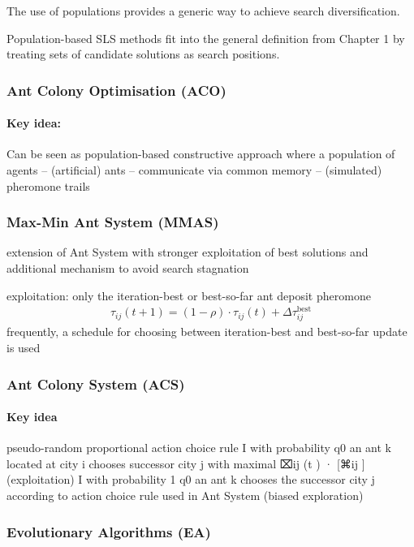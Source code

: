 \documentclass[a4paper,10pt]{article}
\begin{document}
	The use of populations provides a generic way to achieve search diversification.
	
	Population-based SLS methods fit into the general definition from Chapter 1 by treating sets of candidate solutions as search positions.
	
		\subsubsection{Ant Colony Optimisation (ACO)}
		
		
\paragraph{Key idea:} Can be seen as population-based constructive approach where a population of agents – (artificial) ants – communicate via common memory – (simulated) pheromone trails

\subsubsection{Max-Min Ant System (MMAS)}
extension of Ant System with stronger exploitation of best
solutions and additional mechanism to avoid search stagnation

exploitation: only the iteration-best or best-so-far ant deposit pheromone
\begin{align}
	\tau_{ij} (t + 1) = (1 - \rho) \cdot \tau_{ij} (t) + \Delta \tau_{ij}^{\text{best}}
\end{align}
frequently, a schedule for choosing between iteration-best and best-so-far update is used

\subsubsection{Ant Colony System (ACS)}

\paragraph{Key idea}
pseudo-random proportional action choice rule
I with probability q0 an ant k located at city i chooses successor
city j with maximal ⌧ij (t ) · [⌘ij ]  (exploitation)
I with probability 1   q0 an ant k chooses the successor city j according to action choice rule used in Ant System (biased exploration)
\subsubsection{Evolutionary Algorithms (EA)}
\end{document}
